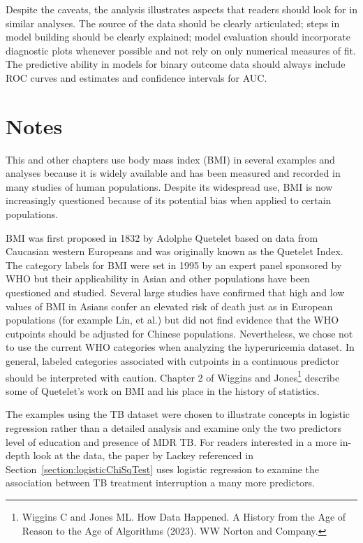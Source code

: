Despite the caveats, the analysis illustrates aspects that readers should look for in similar analyses. The source of the data should be clearly articulated; steps in model building should be clearly explained; model evaluation should incorporate diagnostic plots whenever  possible and not rely on only numerical  measures of fit.  The predictive ability in models for binary outcome data should always include ROC curves and estimates and confidence intervals for AUC.

\textD{\newpage}

\section{Notes}
\label{notesLogisticRegression}

This and other chapters use body mass index (BMI) in several examples and analyses because it is widely available and has been measured and recorded in many studies of human populations. Despite its widespread use, BMI is now increasingly questioned because of its potential bias when applied to certain populations.

BMI was first proposed in 1832 by Adolphe Quetelet based on data from Caucasian western Europeans and was originally known as the Quetelet Index. The category labels for BMI were set in 1995 by an expert panel sponsored by WHO but their applicability in Asian and other populations have been questioned and studied.  Several large studies have confirmed that high and low values of BMI in Asians confer an elevated risk of death just as in European populations (for example Lin, et al.) but did not find evidence that the WHO cutpoints should be adjusted for Chinese populations.   Nevertheless, we chose not to use the current WHO categories when analyzing the hyperuricemia dataset.  In general, labeled categories associated with cutpoints in a continuous predictor should be interpreted with caution.  Chapter 2 of Wiggins and Jones\footnote{Wiggins C and Jones ML.  How Data Happened.  A History from the Age of Reason to the Age of Algorithms (2023).  WW Norton and Company.} describe some of Quetelet's work on BMI and his place in the history of statistics.

The examples using the TB dataset were chosen to illustrate concepts in logistic regression rather than a detailed analysis and examine only the two predictors level of education and presence of MDR TB.  For readers interested in a more in-depth look at the data, the paper by Lackey referenced in Section~\ref{section:logisticChiSqTest} uses logistic regression to examine the association between TB treatment interruption a many more predictors.

